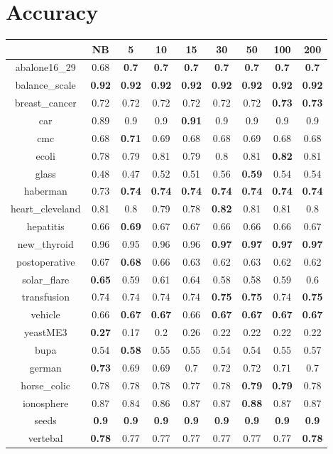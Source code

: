 \documentclass{article}%
\begin{document}
%
\normalsize%
\section*{Accuracy}%
\begin{tabular}{c|cccccccc}%
\hline%
&NB&5&10&15&30&50&100&200\\%
\hline%
abalone16\_29&0.68&\textbf{0.7}&\textbf{0.7}&\textbf{0.7}&\textbf{0.7}&\textbf{0.7}&\textbf{0.7}&\textbf{0.7}\\%
\hline%
balance\_scale&\textbf{0.92}&\textbf{0.92}&\textbf{0.92}&\textbf{0.92}&\textbf{0.92}&\textbf{0.92}&\textbf{0.92}&\textbf{0.92}\\%
\hline%
breast\_cancer&0.72&0.72&0.72&0.72&0.72&0.72&\textbf{0.73}&\textbf{0.73}\\%
\hline%
car&0.89&0.9&0.9&\textbf{0.91}&0.9&0.9&0.9&0.9\\%
\hline%
cmc&0.68&\textbf{0.71}&0.69&0.68&0.68&0.69&0.68&0.68\\%
\hline%
ecoli&0.78&0.79&0.81&0.79&0.8&0.81&\textbf{0.82}&0.81\\%
\hline%
glass&0.48&0.47&0.52&0.51&0.56&\textbf{0.59}&0.54&0.54\\%
\hline%
haberman&0.73&\textbf{0.74}&\textbf{0.74}&\textbf{0.74}&\textbf{0.74}&\textbf{0.74}&\textbf{0.74}&\textbf{0.74}\\%
\hline%
heart\_cleveland&0.81&0.8&0.79&0.78&\textbf{0.82}&0.81&0.81&0.8\\%
\hline%
hepatitis&0.66&\textbf{0.69}&0.67&0.67&0.66&0.66&0.66&0.67\\%
\hline%
new\_thyroid&0.96&0.95&0.96&0.96&\textbf{0.97}&\textbf{0.97}&\textbf{0.97}&\textbf{0.97}\\%
\hline%
postoperative&0.67&\textbf{0.68}&0.66&0.63&0.62&0.63&0.62&0.62\\%
\hline%
solar\_flare&\textbf{0.65}&0.59&0.61&0.64&0.58&0.58&0.59&0.6\\%
\hline%
transfusion&0.74&0.74&0.74&0.74&\textbf{0.75}&\textbf{0.75}&0.74&\textbf{0.75}\\%
\hline%
vehicle&0.66&\textbf{0.67}&\textbf{0.67}&0.66&\textbf{0.67}&\textbf{0.67}&\textbf{0.67}&\textbf{0.67}\\%
\hline%
yeastME3&\textbf{0.27}&0.17&0.2&0.26&0.22&0.22&0.22&0.22\\%
\hline%
bupa&0.54&\textbf{0.58}&0.55&0.55&0.54&0.54&0.55&0.57\\%
\hline%
german&\textbf{0.73}&0.69&0.69&0.7&0.72&0.72&0.71&0.7\\%
\hline%
horse\_colic&0.78&0.78&0.78&0.77&0.78&\textbf{0.79}&\textbf{0.79}&0.78\\%
\hline%
ionosphere&0.87&0.84&0.86&0.87&0.87&\textbf{0.88}&0.87&0.87\\%
\hline%
seeds&\textbf{0.9}&\textbf{0.9}&\textbf{0.9}&\textbf{0.9}&\textbf{0.9}&\textbf{0.9}&\textbf{0.9}&\textbf{0.9}\\%
\hline%
vertebal&\textbf{0.78}&0.77&0.77&0.77&0.77&0.77&0.77&\textbf{0.78}\\%
\hline%
\end{tabular}
\end{document}
